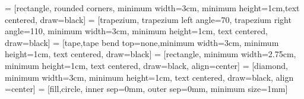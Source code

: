 %
 = [rectangle, rounded corners, minimum width=3cm, 
minimum height=1cm,text centered, draw=black]
 = [trapezium, trapezium left angle=70, trapezium right angle=110, 
minimum width=3cm, minimum height=1cm, text centered, draw=black]
 = [tape,tape bend top=none,minimum width=3cm, minimum height=1cm, text centered, draw=black]
 = [rectangle, minimum width=2.75cm, minimum height=1cm, 
text centered, draw=black, align=center]
 = [diamond, minimum width=3cm, minimum height=1cm, text centered, 
draw=black, align =center]
   = [fill,circle, inner sep=0mm, outer sep=0mm, minimum size=1mm]
